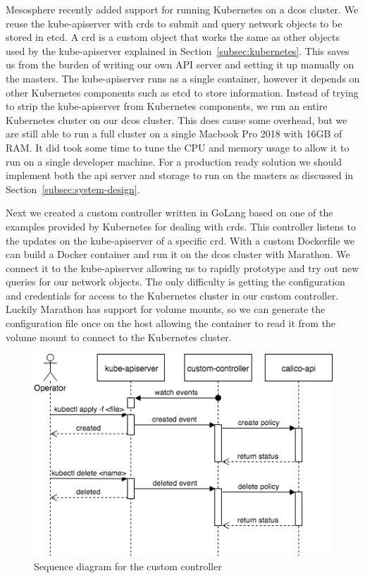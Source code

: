 Mesosphere recently added support for running Kubernetes on a \gls{dcos} cluster. We reuse the kube-apiserver with \glspl{crd} to submit and query network objects to be stored in etcd. A \gls{crd} is a custom object that works the same as other objects used by the kube-apiserver explained in Section~\ref{subsec:kubernetes}. This saves us from the burden of writing our own API server and setting it up manually on the masters. The kube-apiserver runs as a single container, however it depends on other Kubernetes components such as etcd to store information. Instead of trying to strip the kube-apiserver from Kubernetes components, we run an entire Kubernetes cluster on our \gls{dcos} cluster. This does cause some overhead, but we are still able to run a full cluster on a single Macbook Pro 2018 with 16GB of RAM. It did took some time to tune the CPU and memory usage to allow it to run on a single developer machine. For a production ready solution we should implement both the \gls{api} server and storage to run on the masters as discussed in Section~\ref{subsec:system-design}.

Next we created a custom controller written in GoLang\cite{golang} based on one of the examples provided by Kubernetes for dealing with \glspl{crd}. This controller listens to the updates on the kube-apiserver of a specific \gls{crd}. With a custom Dockerfile we can build a Docker container and run it on the \gls{dcos} cluster with Marathon. We connect it to the kube-apiserver allowing us to rapidly prototype and try out new queries for our network objects. The only difficulty is getting the configuration and credentials for access to the Kubernetes cluster in our custom controller. Luckily Marathon has support for volume mounts, so we can generate the configuration file once on the host allowing the container to read it from the volume mount to connect to the Kubernetes cluster.

\begin{figure}[ht]
    \centering
    \includegraphics[width=0.7\columnwidth]{images/customer-controller-sequence-diagram}
    \caption{Sequence diagram for the custom controller}
    \label{fig:custrom-controller-sequence-diagram}
\end{figure}


